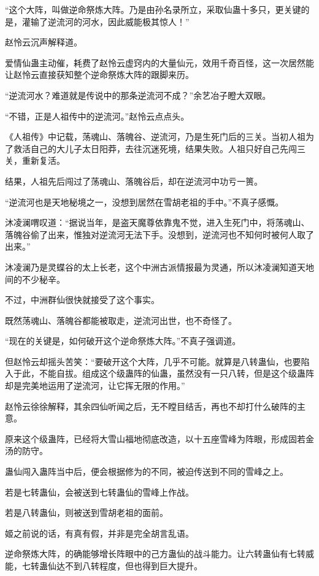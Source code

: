 
\begin{this_body}

“这个大阵，叫做逆命祭炼大阵。乃是由孙名录所立，采取仙蛊十多只，更关键的是，灌输了逆流河的河水，因此威能极其惊人！”

赵怜云沉声解释道。

爱情仙蛊主动催，耗费了赵怜云虚窍内的大量仙元，效用千奇百怪，这一次居然能让赵怜云直接获知整个逆命祭炼大阵的跟脚来历。

“逆流河水？难道就是传说中的那条逆流河不成？”余艺冶子瞪大双眼。

“不错，正是人祖传中的逆流河。”赵怜云点点头。

《人祖传》中记载，荡魂山、落魄谷、逆流河，乃是生死门后的三关。当初人祖为了救活自己的大儿子太日阳莽，去往沉迷死境，结果失败。人祖只好自己先闯三关，重新复活。

结果，人祖先后闯过了荡魂山、落魄谷后，却在逆流河中功亏一篑。

“逆流河也是天地秘境之一，没想到居然在雪胡老祖的手中。”不真子感慨。

沐凌澜喟叹道：“据说当年，是盗天魔尊依靠鬼不觉，进入生死门中，将荡魂山、落魄谷偷了出来，惟独对逆流河无法下手。没想到，逆流河也不知何时被何人取了出来。”

沐凌澜乃是灵蝶谷的太上长老，这个中洲古派情报最为灵通，所以沐凌澜知道天地间的不少秘辛。

不过，中洲群仙很快就接受了这个事实。

既然荡魂山、落魄谷都能被取走，逆流河出世，也不奇怪了。

“现在的关键是，如何破开这个逆命祭炼大阵。”不真子强调道。

但赵怜云却摇头苦笑：“要破开这个大阵，几乎不可能。就算是八转蛊仙，也要陷入于此，不能自拔。组成这个级蛊阵的仙蛊，虽然没有一只八转，但是这个级蛊阵却是完美地运用了逆流河，让它挥无限的作用。”

赵怜云徐徐解释，其余四仙听闻之后，无不瞠目结舌，再也不却打什么破阵的主意。

原来这个级蛊阵，已经将大雪山福地彻底改造，以十五座雪峰为阵眼，形成固若金汤的防守。

蛊仙闯入蛊阵当中后，便会根据修为的不同，被迫传送到不同的雪峰之上。

若是七转蛊仙，会被送到七转蛊仙的雪峰上作战。

若是八转蛊仙，则被送到雪胡老祖的面前。

姬之前说的话，有真有假，并非是完全胡言乱语。

逆命祭炼大阵，的确能够增长阵眼中的己方蛊仙的战斗能力。让六转蛊仙有七转威能，七转蛊仙达不到八转程度，但也得到巨大提升。


\end{this_body}

